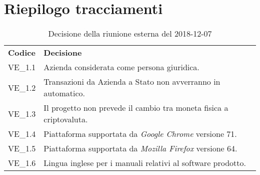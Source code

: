 \pagebreak

\section{Riepilogo tracciamenti}
\begin{table}[H]
	
	\begin{longtable}{ >{\centering}p{} >{\centering}p{}}
			
		\rowcolorhead
		\centering \textbf{\color{white}Codice} 
		& \centering \textbf{\color{white}Decisione} 
		
		\tabularnewline 
		VE\_1.1 & Azienda considerata come persona giuridica.
		
		\tabularnewline 
		VE\_1.2 & Transazioni da Azienda a Stato non avverranno in automatico.
		
		\tabularnewline 
		VE\_1.3 & Il progetto non prevede il cambio tra moneta fisica a criptovaluta.
	
		\tabularnewline 
		VE\_1.4 & Piattaforma supportata da \textit{Google Chrome} versione 71.
		
		\tabularnewline 
		VE\_1.5 & Piattaforma supportata da \textit{Mozilla Firefox} versione 64.
		
		\tabularnewline 
		VE\_1.6 & Lingua inglese per i manuali relativi al software prodotto.
	
	\end{longtable}
	\caption{Decisione della riunione esterna del 2018-12-07}	

\end{table}

